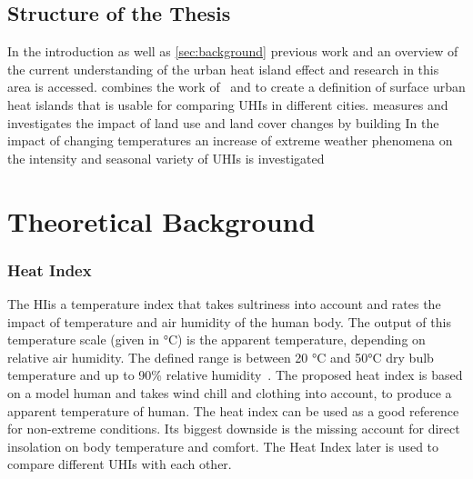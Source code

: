 \documentclass[a4paper, english]{article}
\begin{document}

    \subsection{Structure of the Thesis}
    In the introduction as well as \cref{sec:background} previous work and an overview of the current understanding of the urban heat island effect and research in this area is accessed. 
     combines the work of~\cite{Sobrino2020} and %
    to create a definition of surface urban heat islands that is usable for comparing \glspl{UHI} in different cities.  
     measures and investigates the impact of land use and land cover changes by building
    In  the impact of changing temperatures an increase of extreme weather phenomena on the intensity and seasonal variety of \glspl{UHI} is investigated 

   


\section{Theoretical Background}
    
    \newpage
    \subsubsection{Heat Index}
    The \gls{HI}is a temperature index that takes sultriness into account and rates the impact of temperature and air humidity of the human body. 
    The output of this temperature scale (given in °C) is the apparent temperature, depending on relative air humidity. 
    The defined range is between 20 °C and 50°C dry bulb temperature and up to 90\% relative humidity~\cite[p. 862]{Steadman1979}. 
    The proposed heat index is based on a model human and takes wind chill and clothing into account, to produce a apparent temperature of human. 
    The heat index can be used as a good reference for non-extreme conditions. 
    Its biggest downside is the missing account for direct insolation on body temperature and comfort.
    The Heat Index later is used to compare different \glspl{UHI} with each other.
\end{document}
